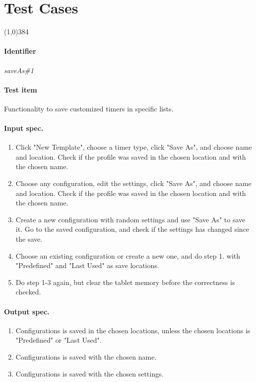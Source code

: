 \section{Test Cases}
\label{sec:test_cases}

\pagebreak
\begin{center}
	\line(1,0){384}
\end{center}
\paragraph{Identifier}
	\textit{saveAs\#1}
\paragraph{Test item}
	Functionality to save customized timers in specific lists.
\paragraph{Input spec.}
	\begin{enumerate}
		\item Click "New Template", choose a timer type, click "Save As", and choose name and location. Check if the profile was saved in the chosen location and with the chosen name.
		\item Choose any configuration, edit the settings, click "Save As", and choose name and location. Check if the profile was saved in the chosen location and with the chosen name.
		\item Create a new configuration with random settings and use "Save As" to save it. Go to the saved configuration, and check if the settings has changed since the save.
		\item Choose an existing configuration or create a new one, and do step 1. with "Predefined" and "Last Used" as save locations.
		\item Do step 1-3 again, but clear the tablet memory before the correctness is checked.
	\end{enumerate}
\paragraph{Output spec.}
	\begin{enumerate}
		\item Configurations is saved in the chosen locations, unless the chosen locations is "Predefined" or "Last Used".
		\item Configurations is saved with the chosen name.
		\item Configurations is saved with the chosen settings.
	\end{enumerate}
